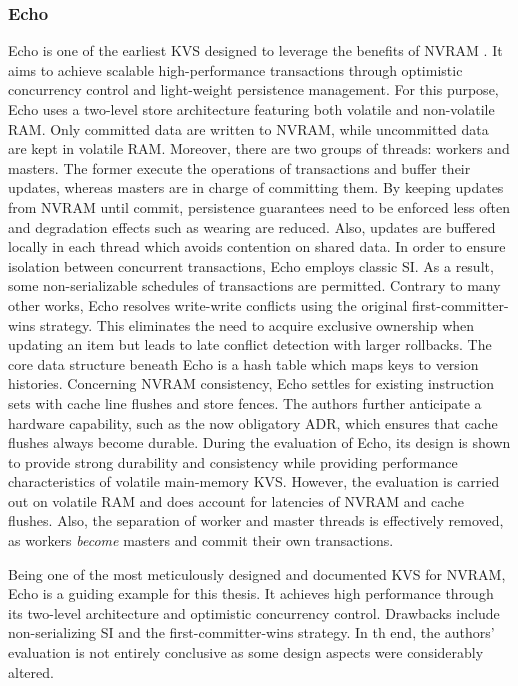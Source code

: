 \subsubsection{Echo}

Echo is one of the earliest \ac{KVS} designed to leverage the benefits of \ac{NVRAM}
\cite{bailey2013exploring}. It aims to achieve scalable high-performance
transactions through optimistic concurrency control and light-weight persistence
management. For this purpose, Echo uses a two-level store architecture featuring
both volatile and non-volatile \ac{RAM}. Only committed data are written to \ac{NVRAM},
while uncommitted data are kept in volatile \ac{RAM}. Moreover, there are two groups
of threads: workers and masters. The former execute the operations of
transactions and buffer their updates, whereas masters are in charge of
committing them. By keeping updates from \ac{NVRAM} until commit, persistence
guarantees need to be enforced less often and degradation effects such as
wearing are reduced. Also, updates are buffered locally in each thread which
avoids contention on shared data. In order to ensure isolation between
concurrent transactions, Echo employs classic \ac{SI}. As a result, some
non-serializable schedules of transactions are permitted. Contrary to many other
works, Echo resolves write-write conflicts using the original
first-committer-wins strategy. This eliminates the need to acquire exclusive
ownership when updating an item but leads to late conflict detection with larger
rollbacks. The core data structure beneath Echo is a hash table which maps keys
to version histories. Concerning \ac{NVRAM} consistency, Echo settles for existing
instruction sets with cache line flushes and store fences. The authors further
anticipate a hardware capability, such as the now obligatory \ac{ADR}, which ensures
that cache flushes always become durable. During the evaluation of Echo, its
design is shown to provide strong durability and consistency while providing
performance characteristics of volatile main-memory \ac{KVS}. However, the evaluation
is carried out on volatile \ac{RAM} and does account for latencies of \ac{NVRAM} and cache
flushes. Also, the separation of worker and master threads is effectively
removed, as workers \emph{become} masters and commit their own transactions.

Being one of the most meticulously designed and documented \ac{KVS} for \ac{NVRAM}, Echo
is a guiding example for this thesis. It achieves high performance through its
two-level architecture and optimistic concurrency control. Drawbacks include
non-serializing \ac{SI} and the first-committer-wins strategy. In th end, the
authors' evaluation is not entirely conclusive as some design aspects were
considerably altered.

